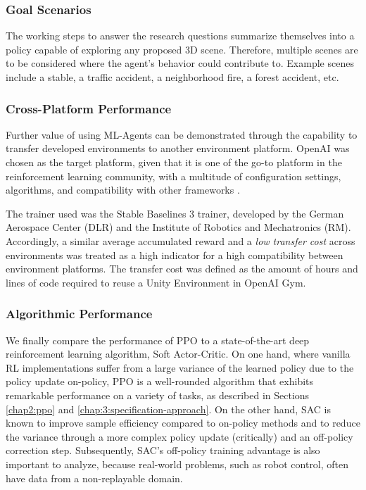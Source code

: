 \subsubsection{Goal Scenarios}\label{chap:3:further-generalization}

The working steps to answer the research questions summarize themselves into a policy capable of exploring any proposed 3D scene. Therefore, multiple scenes are to be considered where the agent's behavior could contribute to. Example scenes include a stable, a traffic accident, a neighborhood fire, a forest accident, etc.

\subsubsection{Cross-Platform Performance}\label{chap:3:further-generalization}
Further value of using ML-Agents can be demonstrated through the capability to transfer developed environments to another environment platform. OpenAI \cite{github-openai-gym} was chosen as the target platform, given that it is one of the go-to platform in the reinforcement learning community, with a multitude of configuration settings, algorithms, and compatibility with other frameworks \cite{github-openai-gym}.

The trainer used was the Stable Baselines 3 \cite{github-dlr-rm-baselines3} trainer, developed by the German Aerospace Center (DLR) and the Institute of Robotics and Mechatronics (RM). Accordingly, a similar average accumulated reward and a \textit{low transfer cost} across environments was treated as a high indicator for a high compatibility between environment platforms.  The transfer cost was defined as the amount of hours and lines of code required to reuse a Unity Environment in OpenAI Gym.

\subsubsection{Algorithmic Performance} \label{chap:3:algorithmic-performance}
We finally compare the performance of PPO to a state-of-the-art deep reinforcement learning algorithm, Soft Actor-Critic. 
On one hand, where vanilla RL implementations suffer from a large variance of the learned policy due to the policy update on-policy, PPO is a well-rounded algorithm that exhibits remarkable performance on a variety of tasks, as described in Sections \ref{chap2:ppo} and \ref{chap:3:specification-approach}. On the other hand, SAC is known to improve sample efficiency compared to on-policy methods and to reduce the variance through a more complex policy update (critically) and an off-policy correction step. Subsequently, SAC's off-policy training advantage is also important to analyze, because real-world problems, such as robot control, often have data from a non-replayable domain. 





